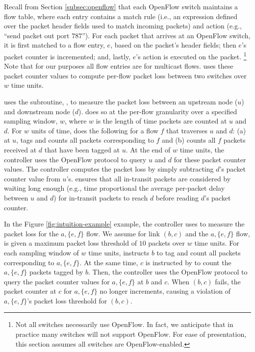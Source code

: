 Recall from Section \ref{subsec:openflow} that each OpenFlow switch maintains a flow table, where each entry contains a match rule 
(i.e., an expression defined over the packet header fields used to match incoming packets) and action 
(e.g., ``send packet out port $787$''). For each packet that arrives at an OpenFlow switch, it is first matched to a flow entry, $e$, based on the packet's header fields; 
then $e$'s packet counter is incremented; and, lastly, $e$'s action is executed on the packet. 
\footnote{Not all switches necessarily use OpenFlow. In fact, we anticipate that in practice many switches will not support OpenFlow. For ease of presentation, this section assumes all switches are OpenFlow-enabled. }
Note that for our purposes all flow entries are for multicast flows. 
\fl uses these packet counter values to compute per-flow packet loss between two switches over $w$ time units. 

\fl uses the subroutine, \pcnts, to measure the packet loss between an upstream node ($u$) and downstream node ($d$).  \pcnt does so at the per-flow granularity over a specified sampling window, $w$, 
where $w$ is the length of time packets are counted at $u$ and $d$. For $w$ units of time, \pcnt does the following for a flow $f$ that traverses $u$ and $d$: (a) at $u$, tags and counts all packets corresponding to $f$ and (b) counts all $f$ packets received at $d$ that have been tagged at $u$.  At the end of $w$ time units, the controller uses the OpenFlow protocol 
to query $u$ and $d$ for these packet counter values. The controller computes the packet loss by simply subtracting $d$'s packet counter value from $u$'s. 
\pcnt ensures that all in-transit packets are considered by waiting long enough (e.g., time proportional the average per-packet delay between $u$ and $d$) for in-transit packets to reach $d$ before reading $d$'s packet counter.

In the Figure \ref{fig:intuition-example} example, the controller uses \fl to measure the packet loss for the $a,\{e,f\}$ flow.  
We assume for link $(b,c)$ and the $a,\{e,f\}$ flow, \fl is given a maximum packet loss threshold of $10$ packets over $w$ time units.
For each sampling window of $w$ time units, \pcnt instructs $b$ to tag and count all packets corresponding to $a,\{e,f\}$. 
At the same time, $c$ is instructed by \pcnt to count the $a,\{e,f\}$ packets tagged by $b$. Then, the controller uses the OpenFlow protocol to query the packet counter values for $a,\{e,f\}$
at $b$ and $c$.  When $(b,c)$ fails, the packet counter at $c$ for $a,\{e,f\}$ no longer increments, causing a violation of $a,\{e,f\}$'s packet loss threshold for $(b,c)$.

